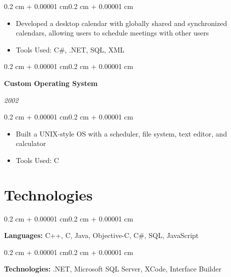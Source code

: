 \documentclass[10pt, letterpaper]{article}
\newenvironment{highlights}{
    \begin{itemize}[
        topsep=0.10 cm,
        parsep=0.10 cm,
        partopsep=0pt,
        itemsep=0pt,
        leftmargin=0.4 cm + 10pt
    ]
}{
    \end{itemize}
}
\newenvironment{onecolentry}{
    \begin{adjustwidth}{0.2 cm + 0.00001 cm}{0.2 cm + 0.00001 cm}
}{
    \end{adjustwidth}
}
\newenvironment{twocolentry}[2][]{
    \onecolentry
    \def\secondColumn{#2}
    \setcolumnwidth{\fill, 4.5 cm}
    \begin{paracol}{2}
}{
    \switchcolumn \raggedleft \secondColumn
    \end{paracol}
    \endonecolentry
}
\begin{document}
    \vspace{0.10 cm}
    
    \begin{onecolentry}
        \begin{highlights}
            \item Developed a desktop calendar with globally shared and synchronized calendars, allowing users to schedule meetings with other users
            \item Tools Used: C\#, .NET, SQL, XML
        \end{highlights}
    \end{onecolentry}

    \vspace{0.2 cm}

    \begin{twocolentry}{\textit{2002}}
        \textbf{Custom Operating System}
    \end{twocolentry}

    \vspace{0.10 cm}
    
    \begin{onecolentry}
        \begin{highlights}
            \item Built a UNIX-style OS with a scheduler, file system, text editor, and calculator
            \item Tools Used: C
        \end{highlights}
    \end{onecolentry}

    \section{Technologies}

    \begin{onecolentry}
        \textbf{Languages:} C++, C, Java, Objective-C, C\#, SQL, JavaScript
    \end{onecolentry}

    \vspace{0.2 cm}

    \begin{onecolentry}
        \textbf{Technologies:} .NET, Microsoft SQL Server, XCode, Interface Builder
    \end{onecolentry}
\end{document}
